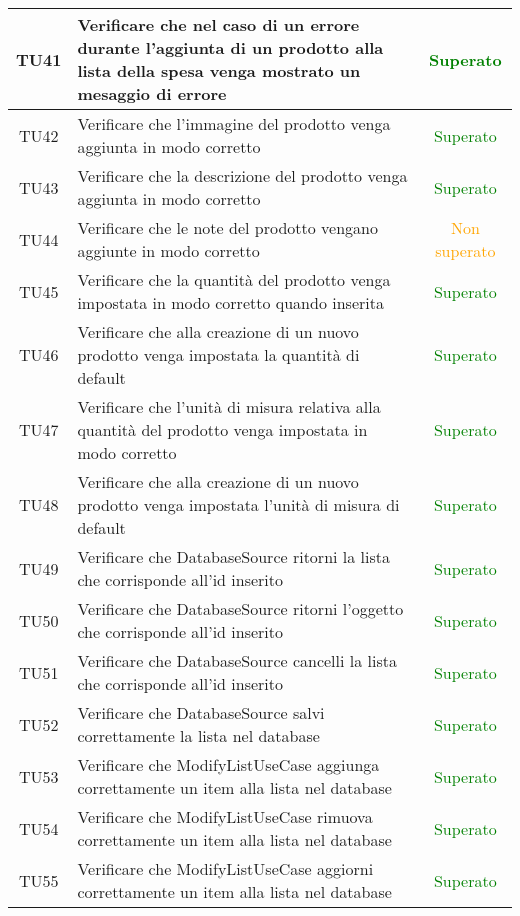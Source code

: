 \begin{center}
\begin{longtable}{|c|>{\centering}m{10cm}|c|}
		TU41 & Verificare che nel caso di un errore durante l'aggiunta di un prodotto alla lista della spesa venga mostrato un mesaggio di errore & \textcolor{Green}{Superato}\\ \hline
		TU42 & Verificare che l'immagine del prodotto venga aggiunta in modo corretto & \textcolor{Green}{Superato}\\ \hline
		TU43 & Verificare che la descrizione del prodotto venga aggiunta in modo corretto & \textcolor{Green}{Superato}\\ \hline
		TU44 & Verificare che le note del prodotto vengano aggiunte in modo corretto & \textcolor{Orange}{Non superato}\\ \hline
		TU45 & Verificare che la quantità del prodotto venga impostata in modo corretto quando inserita & \textcolor{Green}{Superato}\\ \hline
		TU46 & Verificare che alla creazione di un nuovo prodotto venga impostata la quantità di default & \textcolor{Green}{Superato}\\ \hline
		TU47 & Verificare che l'unità di misura relativa alla quantità del prodotto venga impostata in modo corretto & \textcolor{Green}{Superato}\\ \hline
		TU48 & Verificare che alla creazione di un nuovo prodotto venga impostata l'unità di misura di default & \textcolor{Green}{Superato}\\ \hline
		TU49 & Verificare che DatabaseSource ritorni la lista che corrisponde all'id inserito & \textcolor{Green}{Superato}\\ \hline
		TU50 & Verificare che DatabaseSource ritorni l'oggetto che corrisponde all'id inserito & \textcolor{Green}{Superato}\\ \hline
		TU51 & Verificare che DatabaseSource cancelli la lista che corrisponde all'id inserito & \textcolor{Green}{Superato}\\ \hline
		TU52 & Verificare che DatabaseSource salvi correttamente la lista nel database & \textcolor{Green}{Superato}\\ \hline
		TU53 & Verificare che ModifyListUseCase aggiunga correttamente un item alla lista nel database & \textcolor{Green}{Superato}\\ \hline
		TU54 & Verificare che ModifyListUseCase rimuova correttamente un item alla lista nel database & \textcolor{Green}{Superato}\\ \hline
		TU55 & Verificare che ModifyListUseCase aggiorni correttamente un item alla lista nel database & \textcolor{Green}{Superato}\\ \hline

\end{longtable}
\end{center}
